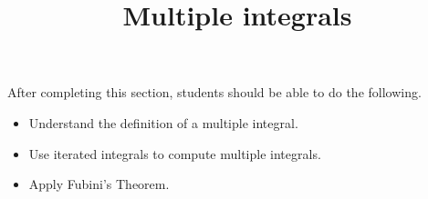 \documentclass{ximera}
\title{Multiple integrals}
\begin{document}
\begin{abstract}
\end{abstract}
\maketitle

\begin{sectionOutcomes}

After completing this section, students should be able to do the following.

\begin{itemize}
\item Understand the definition of a multiple integral.
\item Use iterated integrals to compute multiple integrals.
\item Apply Fubini's Theorem.
\end{itemize}

\end{sectionOutcomes}
\end{document}
